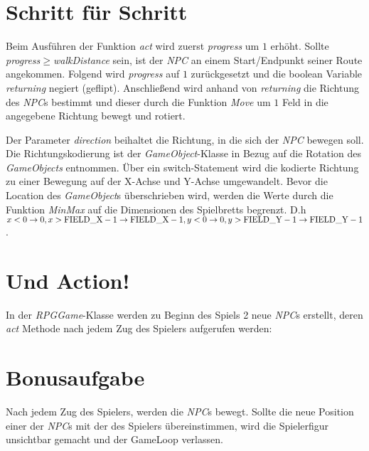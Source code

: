 \documentclass{pi1}
\begin{document}
\section{Schritt für Schritt}

Beim Ausführen der Funktion \textit{act} wird zuerst \textit{progress} um $1$ erhöht. 
Sollte \textit{progress}$\geq$\textit{walkDistance} sein, ist der \textit{NPC} an einem Start/Endpunkt seiner Route angekommen. 
Folgend wird \textit{progress} auf $1$ zurückgesetzt und die boolean Variable \textit{returning} negiert (geflipt). 
Anschließend wird anhand von \textit{returning} die Richtung des \textit{NPC}s bestimmt und dieser durch die Funktion \textit{Move} um $1$ Feld in die angegebene Richtung bewegt und rotiert.

Der Parameter \textit{\textunderscore direction} beihaltet die Richtung, in die sich der \textit{NPC} bewegen soll. 
Die Richtungskodierung ist der \textit{GameObject}-Klasse in Bezug auf die Rotation des \textit{GameObjects} entnommen. 
Über ein switch-Statement wird die kodierte Richtung zu einer Bewegung auf der X-Achse und Y-Achse umgewandelt. Bevor die Location des \textit{GameObject}s überschrieben wird, werden die Werte durch die Funktion \textit{MinMax} auf die Dimensionen des Spielbretts begrenzt. D.h 
$x<0\to 0,
x>\text{FIELD\textunderscore X}-1\to \text{FIELD\textunderscore X}-1,
y<0\to 0,
y>\text{FIELD\textunderscore Y}-1\to \text{FIELD\textunderscore Y}-1$.\\

\section{Und Action!}

In der \textit{RPGGame}-Klasse werden zu Beginn des Spiels 2 neue \textit{NPC}s erstellt, deren \textit{act} Methode nach jedem Zug des Spielers aufgerufen werden:

\newpage

\section{Bonusaufgabe}

Nach jedem Zug des Spielers, werden die \textit{NPC}s bewegt. Sollte die neue Position einer der \textit{NPC}s mit der des Spielers übereinstimmen, wird die Spielerfigur unsichtbar gemacht und der GameLoop verlassen.
\end{document}
